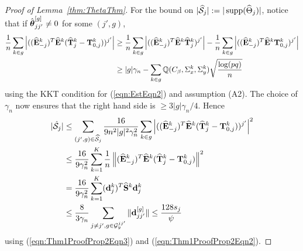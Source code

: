 \begin{proof}[Proof of Lemma~\ref{thm:ThetaThm}]
For the bound on $| \widehat {{\cal{S}}}_j| := |\operatorname*{supp}( \widehat \Theta_j)|$, notice that if $\hat {{\boldsymbol{\theta}}}_{jj'}^{[g]} \neq 0$ for some $(j',g)$,
%
\begin{align*}
\frac{1}{n} \sum_{k \in g} \left| ((\widehat {{\mathbf{E}}}_{-j}^k)^T \widehat {{\mathbf{E}}}^k ( \widehat {{\mathbf{T}}}_j^k - {\mathbf{T}}_{0,j}^k ))^{j'} \right| & \geq
\frac{1}{n} \sum_{k \in g} \left| ((\widehat {{\mathbf{E}}}_{-j}^k)^T \widehat {{\mathbf{E}}}^k \widehat {{\mathbf{T}}}_j^k )^{j'} \right| - \frac{1}{n} \sum_{k \in g} \left| ((\widehat {{\mathbf{E}}}_{-j}^k)^T \widehat {{\mathbf{E}}}^k {\mathbf{T}}_{0,j}^k )^{j'} \right|\\
& \geq |g| \gamma_n - \sum_{k \in g} {\mathbb{Q}} ( C_\beta, \Sigma_x^k, \Sigma_y^k ) \sqrt{ \frac{ \log (pq)}{n}}
\end{align*}
%
using the KKT condition for (\ref{eqn:EstEqn2}) and assumption (A2). The choice of $\gamma_n$ now ensures that the right hand side is $\geq 3|g| \gamma_n / 4$. Hence
%
\begin{align*}
| \hat {{\cal{S}}}_j| & \leq \sum_{(j',g) \in \widehat {{\cal{S}}}_j} \frac{16}{9 n^2 |g|^2 \gamma_n^2 } \sum_{k \in g} \left| ((\widehat {{\mathbf{E}}}_{-j}^k)^T \widehat {{\mathbf{E}}}^k ( \widehat {{\mathbf{T}}}_j^k - {\mathbf{T}}_{0,j}^k ))^{j'} \right|^2\\
& \leq \frac{16}{9 \gamma_n^2} \sum_{k=1}^K \frac{1}{n} \left\| (\widehat {{\mathbf{E}}}_{-j}^k)^T \widehat {{\mathbf{E}}}^k ( \widehat {{\mathbf{T}}}_j^k - {\mathbf{T}}_{0,j}^k ) \right\|^2 \\
& = \frac{16}{9 \gamma_n^2} \sum_{k=1}^K ({\bf{d}}_j^k)^T \widehat {{\mathbf{S}}}^k {\bf{d}}_j^k \\
& \leq \frac{8}{3 \gamma_n} \sum_{j \neq j', g \in {\cal{G}}_y^{jj'}} \| {\bf{d}}_{jj'}^{[g]} \| \leq \frac{128 s_j}{\psi} 
\end{align*}
%
using (\ref{eqn:Thm1ProofProp2Eqn3}) and (\ref{eqn:Thm1ProofProp2Eqn2}).


\end{proof}
